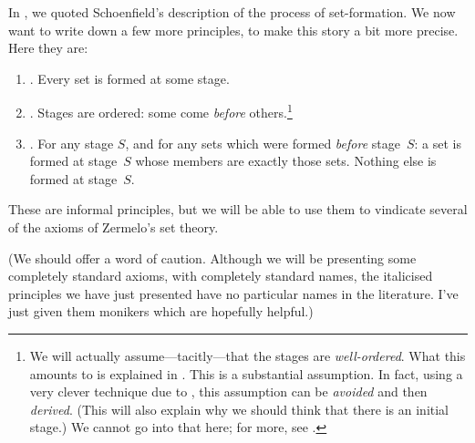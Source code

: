 \documentclass[../../../include/open-logic-section]{subfiles}
\begin{document}
	
In , we quoted Schoenfield's
description of the process of set-formation. We now want to write down
a few more principles, to make this story a bit more precise. Here
they are:
\begin{enumerate}
\item[] \stageshier. Every set is formed at some stage.
\item[] \stagesord. Stages are ordered: some come \emph{before}
others.\footnote{We will actually assume---tacitly---that the stages
are \emph{well-ordered}. What this amounts to is explained in
. This is a substantial assumption. In fact,
using a very clever technique due to \citet{Scott1974}, this
assumption can be \emph{avoided} and then \emph{derived}. (This will
also explain why we should think that there is an initial stage.) We cannot go into that here; for more, see \citet{ButtonLT1}.} 
\item[] \stagesacc. For any stage $S$, and for any sets which were
formed \emph{before} stage~$S$: a set is formed at stage~$S$ whose
members are exactly those sets. Nothing else is formed at stage~$S$.
\end{enumerate}
These are informal principles, but we will be able to use them to
vindicate several of the axioms of Zermelo's set theory. 

(We should offer a word of caution. Although we will be presenting some
completely standard axioms, with completely standard names, the
italicised principles we have just presented have no particular names
in the literature. I've just given them monikers which are hopefully
helpful.)
\end{document}
